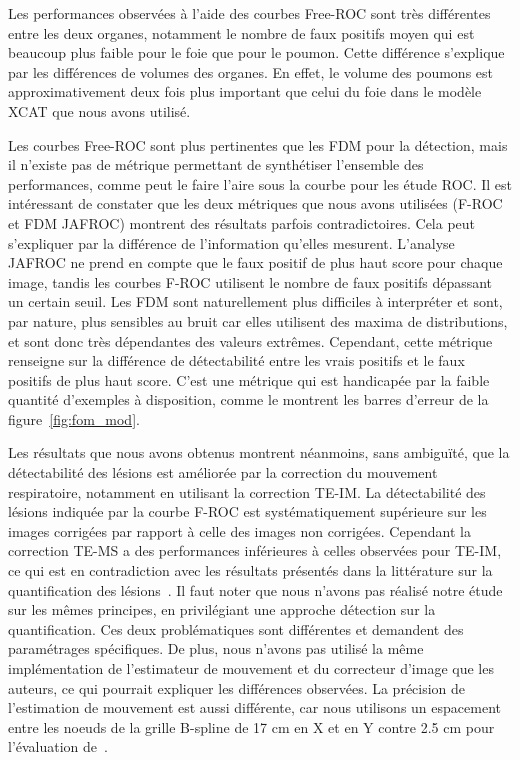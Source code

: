 Les performances observées à l'aide des courbes Free-ROC sont très différentes
 entre les deux organes, notamment le nombre de faux positifs moyen qui est
beaucoup plus faible pour le foie que pour le poumon. Cette différence
s'explique par les différences de volumes des
organes. En effet, le volume des poumons est approximativement deux fois plus
important que celui du foie dans le modèle XCAT que nous avons utilisé.

Les courbes Free-ROC sont plus pertinentes que les FDM pour la
détection, mais il n'existe pas de métrique permettant de synthétiser l'ensemble des performances, comme peut le faire l'aire sous la courbe pour les étude ROC. Il est intéressant de constater que les deux métriques que nous
avons utilisées (F-ROC et FDM JAFROC) montrent des résultats parfois contradictoires. Cela peut
s'expliquer par la différence de l'information qu'elles mesurent. L'analyse JAFROC
ne prend en compte que le faux positif de plus haut score pour chaque image,
tandis les courbes F-ROC utilisent le nombre de faux positifs dépassant un
certain seuil. Les FDM sont naturellement plus difficiles à interpréter et sont,
par nature, plus sensibles au bruit car elles utilisent des maxima de distributions, et sont
donc très dépendantes des valeurs extrêmes. Cependant, cette métrique renseigne
sur la différence de détectabilité entre les vrais positifs et le
faux positifs de plus haut score. C’est une métrique qui est handicapée par la faible quantité d’exemples à disposition, comme
le montrent les barres d’erreur de la figure~\ref{fig:fom_mod}.



Les résultats que nous avons obtenus montrent néanmoins, sans ambiguïté, que
la détectabilité des lésions est améliorée par la correction du mouvement
respiratoire, notamment en utilisant la correction TE-IM. La détectabilité des
lésions indiquée par la courbe F-ROC est systématiquement supérieure sur les
images corrigées par rapport à celle des images non corrigées. Cependant la correction TE-MS a des performances inférieures à celles observées
pour TE-IM, ce qui est en contradiction avec les résultats présentés dans la
littérature sur la quantification des
lésions~\cite{lamare2007list,qiao2006motion}. Il faut noter que nous n'avons pas
réalisé notre
étude sur les mêmes principes, en privilégiant une approche détection sur la
quantification. Ces deux problématiques sont différentes et demandent des
paramétrages spécifiques. De plus, nous n'avons pas utilisé la même
implémentation de l'estimateur de mouvement et du correcteur d'image que
les auteurs, ce qui pourrait expliquer les différences observées. La précision de
l'estimation de mouvement est aussi différente, car nous utilisons un
espacement entre les noeuds de la grille B-spline de 17 cm en X et en Y contre 2.5 cm pour
l'évaluation de~\cite{lamare2007list}.



